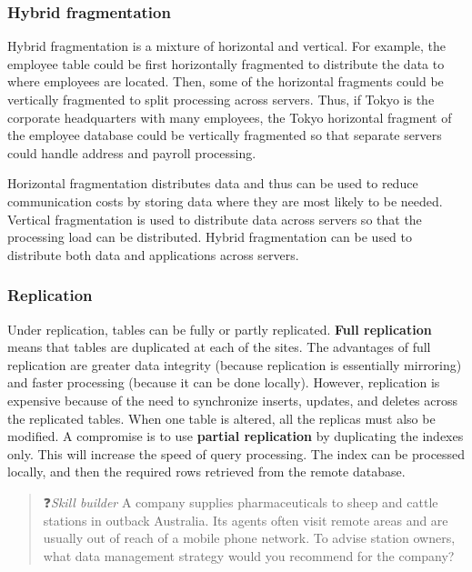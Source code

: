 \documentclass[
]{article}
\begin{document}
\hypertarget{hybrid-fragmentation}{%
\subsubsection*{Hybrid fragmentation}\label{hybrid-fragmentation}}

Hybrid fragmentation is a mixture of horizontal and vertical. For
example, the employee table could be first horizontally fragmented to
distribute the data to where employees are located. Then, some of the
horizontal fragments could be vertically fragmented to split processing
across servers. Thus, if Tokyo is the corporate headquarters with many
employees, the Tokyo horizontal fragment of the employee database could
be vertically fragmented so that separate servers could handle address
and payroll processing.

Horizontal fragmentation distributes data and thus can be used to reduce
communication costs by storing data where they are most likely to be
needed. Vertical fragmentation is used to distribute data across servers
so that the processing load can be distributed. Hybrid fragmentation can
be used to distribute both data and applications across servers.

\hypertarget{replication}{%
\subsubsection*{Replication}\label{replication}}

Under replication, tables can be fully or partly replicated. \textbf{Full
replication} means that tables are duplicated at each of the sites. The
advantages of full replication are greater data integrity (because
replication is essentially mirroring) and faster processing (because it
can be done locally). However, replication is expensive because of the
need to synchronize inserts, updates, and deletes across the replicated
tables. When one table is altered, all the replicas must also be
modified. A compromise is to use \textbf{partial replication} by duplicating
the indexes only. This will increase the speed of query processing. The
index can be processed locally, and then the required rows retrieved
from the remote database.

\begin{quote}
❓\emph{Skill builder} A company supplies pharmaceuticals to sheep and
cattle stations in outback Australia. Its agents often visit remote
areas and are usually out of reach of a mobile phone network. To
advise station owners, what data management strategy would you
recommend for the company?
\end{quote}
\end{document}
